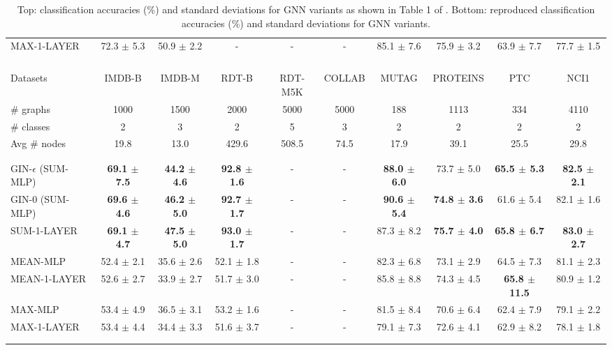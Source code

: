 \documentclass{article} %
\begin{document}
\begin{table}[t]
\begin{center}
{\begin{tabular}{lccccccccc}
\textsc{MAX-1-LAYER}                 &72.3 $\pm$ 5.3 &50.9 $\pm$ 2.2 &- &- &- &85.1 $\pm$ 7.6 &75.9 $\pm$ 3.2 &63.9 $\pm$ 7.7 &77.7 $\pm$ 1.5 \\
\\ \hline \\
\\ \hline \\
Datasets                    &IMDB-B     &IMDB-M     &RDT-B      &RDT-M5K    &COLLAB     &MUTAG      &PROTEINS   &PTC    &NCI1 \\
\# graphs                   &1000       &1500       &2000       &5000       &5000       &188        &1113       &334    &4110 \\
\# classes                  &2          &3          &2          &5          &3          &2          &2          &2      &2    \\
Avg \# nodes                 &19.8       &13.0       &429.6      &508.5      &74.5       &17.9       &39.1       &25.5   &29.8 \\
\\ \hline \\
\textsc{GIN-$\epsilon$ (SUM-MLP)}    &\bf{69.1 $\pm$ 7.5} &\bf{44.2 $\pm$ 4.6} &\bf{92.8 $\pm$ 1.6} &- &- &\bf{88.0 $\pm$ 6.0} &73.7 $\pm$ 5.0 &\bf{65.5 $\pm$ 5.3} &\bf{82.5 $\pm$ 2.1} \\
\textsc{GIN-0 (SUM-MLP)}    &\bf{69.6 $\pm$ 4.6} &\bf{46.2 $\pm$ 5.0} &\bf{92.7 $\pm$ 1.7} &- &- &\bf{90.6 $\pm$ 5.4} &\bf{74.8 $\pm$ 3.6} &61.6 $\pm$ 5.4 &82.1 $\pm$ 1.6 \\
\textsc{SUM-1-LAYER}                 &\bf{69.1 $\pm$ 4.7} &\bf{47.5 $\pm$ 5.0} &\bf{93.0 $\pm$ 1.7} &- &- &87.3 $\pm$ 8.2 &\bf{75.7 $\pm$ 4.0} &\bf{65.8 $\pm$ 6.7} &\bf{83.0 $\pm$ 2.7} \\
\textsc{MEAN-MLP}                    &52.4 $\pm$ 2.1 &35.6 $\pm$ 2.6 &52.1 $\pm$ 1.8 &- &- &82.3 $\pm$ 6.8 &73.1 $\pm$ 2.9 &64.5 $\pm$ 7.3 &81.1 $\pm$ 2.3 \\
\textsc{MEAN-1-LAYER}                &52.6 $\pm$ 2.7 &33.9 $\pm$ 2.7 &51.7 $\pm$ 3.0 &- &- &85.8 $\pm$ 8.8 &74.3 $\pm$ 4.5 &\bf{65.8 $\pm$ 11.5} &80.9 $\pm$ 1.2 \\
\textsc{MAX-MLP}                     &53.4 $\pm$ 4.9 &36.5 $\pm$ 3.1 &53.2 $\pm$ 1.6 &- &- &81.5 $\pm$ 8.4 &70.6 $\pm$ 6.4 &62.4 $\pm$ 7.9 &79.1 $\pm$ 2.2 \\
\textsc{MAX-1-LAYER}                 &53.4 $\pm$ 4.4 &34.4 $\pm$ 3.3 &51.6 $\pm$ 3.7 &- &- &79.1 $\pm$ 7.3 &72.6 $\pm$ 4.1 &62.9 $\pm$ 8.2 &78.1 $\pm$ 1.8 \\
\\ \hline \\
\end{tabular}
}
\end{center}
\caption{Top: classification accuracies (\%) and standard deviations for GNN variants as shown in Table 1 of \cite{ThePaper}. Bottom: reproduced classification accuracies (\%) and standard deviations for GNN variants.}
\end{table}
\end{document}
